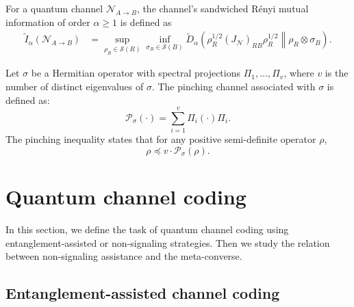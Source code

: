 \documentclass[a4paper,onecolumn,11pt,accepted=2025-10-01]{quantumarticle}
\newcommand*{\cN}{\mathcal{N}}
\newcommand*{\cP}{\mathcal{P}}
\newcommand*{\cS}{\mathcal{S}}
\newcommand*{\mle}{\preccurlyeq}
\begin{document}
For a quantum channel $\cN_{A \rightarrow B}$, the channel's sandwiched R\'enyi mutual information of order $\alpha\ge 1$ is defined as \cite{Gupta2015Mar}
\begin{align} \label{def:sand-mutual-info}
\widetilde{I}_{\alpha}(\cN_{A \rightarrow B})
&=\sup_{\rho_R \in \cS(R)}\inf_{\sigma_B\in \cS(B)}\widetilde{D}_{\alpha}\left( \rho_R^{1/2}(J_\cN)_{RB} \rho_R^{1/2}\middle\|\rho_R \otimes  \sigma_B\right).
\end{align}

Let $\sigma$ be a Hermitian operator with spectral projections $\Pi_1, \dots, \Pi_v$, where  $v$  is the number of distinct eigenvalues of $\sigma$. The pinching channel associated with $\sigma$ is defined as:
\begin{equation}
    \cP_{\sigma} (\cdot)= \sum_{i=1}^v \Pi_i (\cdot) \Pi_i.
\end{equation}
The pinching inequality \cite{Hayashi2002Dec,Tomamichel2016} states that  for any positive semi-definite operator $\rho$,
\begin{equation}\label{eq:pinching-ineq}
   \rho\mle v\cdot\cP_{\sigma} (\rho). 
\end{equation}



\section{Quantum channel coding}\label{sec:quantum-coding}

In this section, we define the task of quantum channel coding using entanglement-assisted or non-signaling strategies. Then we study the relation between non-signaling assistance and the meta-converse.


\subsection{Entanglement-assisted channel coding}\label{sec:EA-coding}
\end{document}
